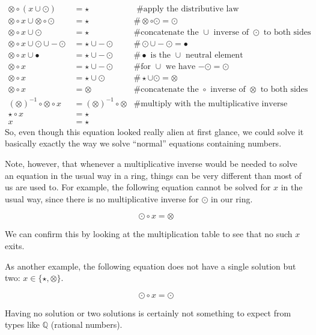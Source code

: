 \begin{example}
\begin{align*}
\otimes \circ (x \cup \odot ) &= \star & \text{ \# apply the distributive law}\\
\otimes \circ x \cup \otimes \circ \odot  &= \star &\# \otimes \circ \odot = \odot\\
\otimes \circ x \cup \odot  &= \star & \text{\# concatenate the $\cup$ inverse of $\odot$ to both sides}\\
\otimes \circ x \cup \odot \cup -\odot  &= \star \cup -\odot & \# \odot \cup -\odot = \bullet\\
\otimes \circ x \cup \bullet &= \star \cup -\odot & \text{\# $\bullet$ is the $\cup$ neutral element}\\
\otimes \circ x &= \star \cup -\odot & \text{\# for $\cup$ we have $-\odot = \odot$} \\
\otimes \circ x &= \star \cup \odot &\# \star \cup \odot = \otimes \\
\otimes \circ x &= \otimes  &\text{\# concatenate the $\circ$ inverse of $\otimes$ to both sides}\\
(\otimes)^{-1}\circ \otimes \circ x &= (\otimes)^{-1}\circ \otimes & \text{\# multiply with the multiplicative inverse}\\
\star \circ x &= \star\\
x &= \star
\end{align*}
So, even though this equation looked really alien at first glance, we could solve it basically exactly the way we solve ``normal'' equations containing numbers.

Note, however, that whenever a multiplicative inverse would be needed to solve an equation in the usual way in a ring, things can be very different than most of us are used to.  For example, the following equation cannot be solved for $x$ in the usual way, since there is no multiplicative inverse for $\odot$ in our ring.

\begin{equation}
\odot \circ x = \otimes
\end{equation}

We can confirm this by looking at the multiplication table to see that no such $x$ exits.

As another example, the following equation does not have a single solution but two: $x\in\{\star, \otimes\}$.

\begin{equation}
\odot \circ x = \odot
\end{equation}

Having no solution or two solutions is certainly not something to expect from types like $\mathbb{Q}$ (rational numbers). 
\end{example}

